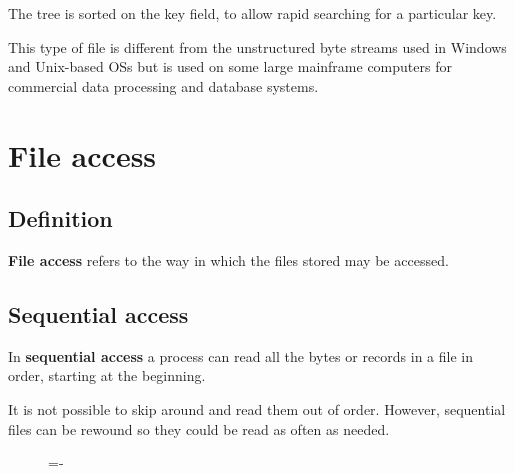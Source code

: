\documentclass[a4paper]{systems-software}
\begin{document}
The tree is sorted on the key field, to allow rapid searching for a particular key.

This type of file is different from the unstructured byte streams used in Windows and Unix-based OSs but is used on some large mainframe computers for commercial data processing and database systems.


\section*{File access}

\subsection*{Definition}

\textbf{File access} refers to the way in which the files stored may be accessed.


\subsection*{Sequential access}

In \textbf{sequential access} a process can read all the bytes or records in a file in order, starting at the beginning.

It is not possible to skip around and read them out of order. However, sequential files can be rewound so they could be read as often as needed.

\begin{figure}[H]
  \lineskip=-\fboxrule
\end{figure}
\end{document}
